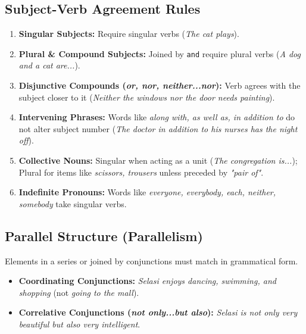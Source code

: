 \documentclass[11pt, a4paper]{article}
\begin{document}
\subsection{Subject-Verb Agreement Rules}
\begin{enumerate}
    \item \textbf{Singular Subjects:} Require singular verbs (\textit{The cat plays}).
    \item \textbf{Plural \& Compound Subjects:} Joined by \texttt{and} require plural verbs (\textit{A dog and a cat are...}).
    \item \textbf{Disjunctive Compounds (\textit{or, nor, neither...nor}):} Verb agrees with the subject closer to it (\textit{Neither the windows nor the door needs painting}).
    \item \textbf{Intervening Phrases:} Words like \textit{along with, as well as, in addition to} do not alter subject number (\textit{The doctor in addition to his nurses has the night off}).
    \item \textbf{Collective Nouns:} Singular when acting as a unit (\textit{The congregation is...}); Plural for items like \textit{scissors, trousers} unless preceded by \textit{"pair of"}.
    \item \textbf{Indefinite Pronouns:} Words like \textit{everyone, everybody, each, neither, somebody} take singular verbs.
\end{enumerate}

\subsection{Parallel Structure (Parallelism)}
Elements in a series or joined by conjunctions must match in grammatical form.
\begin{itemize}
    \item \textbf{Coordinating Conjunctions:} \textit{Selasi enjoys dancing, swimming, and shopping} (not \textit{going to the mall}).
    \item \textbf{Correlative Conjunctions (\textit{not only...but also}):} \textit{Selasi is not only very beautiful but also very intelligent}.
\end{itemize}
\end{document}
